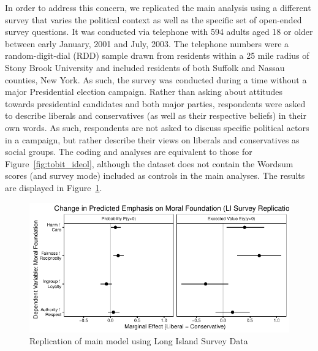 \documentclass[12pt]{article}
\begin{document}
In order to address this concern, we replicated the main analysis using a different survey that varies the political context as well as the specific set of open-ended survey questions. It was conducted via telephone with 594 adults aged 18 or older between early January, 2001 and July, 2003. The telephone numbers were a random-digit-dial (RDD) sample drawn from residents within a 25 mile radius of Stony Brook University and included residents of both Suffolk and Nassau counties, New York. As such, the survey was conducted during a time without a major Presidential election campaign. Rather than asking about attitudes towards presidential candidates and both major parties, respondents were asked to describe liberals and conservatives (as well as their respective beliefs) in their own words. As such, respondents are not asked to discuss specific political actors in a campaign, but rather describe their views on liberals and conservatives as social groups. The coding and analyses are equivalent to those for Figure~\ref{fig:tobit_ideol}, although the dataset does not contain the Wordsum scores (and survey mode) included as controls in the main analyses. The results are displayed in Figure~\ref{fig:tobit_ideol_lisurvey}.

\begin{figure}[ht]\centering
\includegraphics{../calc/fig/tobit_ideol_lisurvey.pdf}
\caption{Replication of main model using Long Island Survey Data
}\label{fig:tobit_ideol_lisurvey}
\end{figure}
\end{document}
